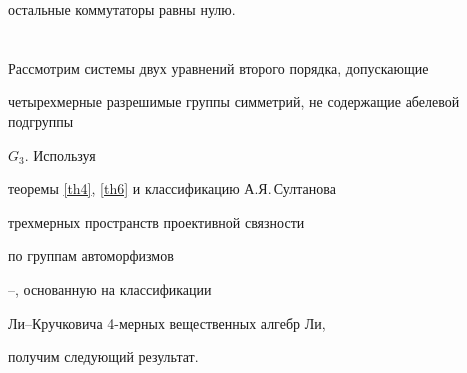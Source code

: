 остальные коммутаторы равны нулю.








\section{}\label{par6}





Рассмотрим системы двух уравнений второго порядка, допускающие


четырехмерные разрешимые группы симметрий, не содержащие абелевой подгруппы 


$G_3$. Используя


теоремы \ref{th4}, \ref{th6} и классификацию А.Я.\,Султанова


трехмерных пространств проективной связности


по группам автоморфизмов


\cite{Sultanov_74}--\cite{Sultanov_81}, основанную на классификации


Ли--Кручковича 4-мерных вещественных алгебр Ли,


получим следующий результат.













